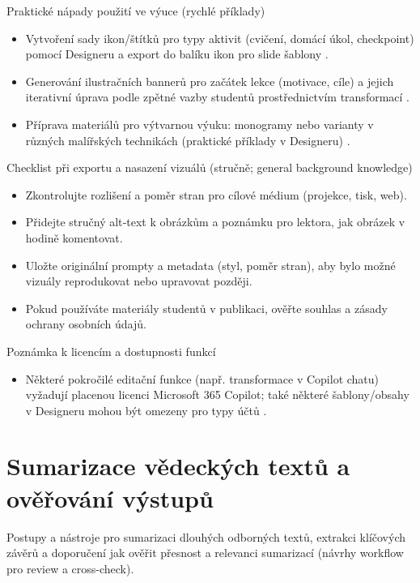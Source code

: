 \documentclass{report}%
\begin{document}
Praktické nápady použití ve výuce (rychlé příklady)
\begin{itemize}
  \item Vytvoření sady ikon/štítků pro typy aktivit (cvičení, domácí úkol, checkpoint) pomocí Designeru a export do balíku ikon pro slide šablony \cite{kb_ai_101_tipu_pdf_04e4a115_page_51_1}.
  \item Generování ilustračních bannerů pro začátek lekce (motivace, cíle) a jejich iterativní úprava podle zpětné vazby studentů prostřednictvím transformací \cite{kb_ai_101_tipu_pdf_04e4a115_page_52_2}.
  \item Příprava materiálů pro výtvarnou výuku: monogramy nebo varianty v různých malířských technikách (praktické příklady v Designeru) \cite{kb_ai_101_tipu_pdf_04e4a115_page_51_1}.
\end{itemize}

Checklist při exportu a nasazení vizuálů (stručně; general background knowledge)
\begin{itemize}
  \item Zkontrolujte rozlišení a poměr stran pro cílové médium (projekce, tisk, web).
  \item Přidejte stručný alt‑text k obrázkům a poznámku pro lektora, jak obrázek v hodině komentovat.
  \item Uložte originální prompty a metadata (styl, poměr stran), aby bylo možné vizuály reprodukovat nebo upravovat později. 
  \item Pokud používáte materiály studentů v publikaci, ověřte souhlas a zásady ochrany osobních údajů. 
\end{itemize}

Poznámka k licencím a dostupnosti funkcí
\begin{itemize}
  \item Některé pokročilé editační funkce (např. transformace v Copilot chatu) vyžadují placenou licenci Microsoft 365 Copilot; také některé šablony/obsahy v Designeru mohou být omezeny pro typy účtů \cite{kb_ai_101_tipu_pdf_04e4a115_page_52_2, kb_ai_101_tipu_pdf_04e4a115_page_51_1}.
\end{itemize}%

%
\section{Sumarizace vědeckých textů a ověřování výstupů}%
Postupy a nástroje pro sumarizaci dlouhých odborných textů, extrakci klíčových závěrů a doporučení jak ověřit přesnost a relevanci sumarizací (návrhy workflow pro review a cross-check).%
\end{document}
